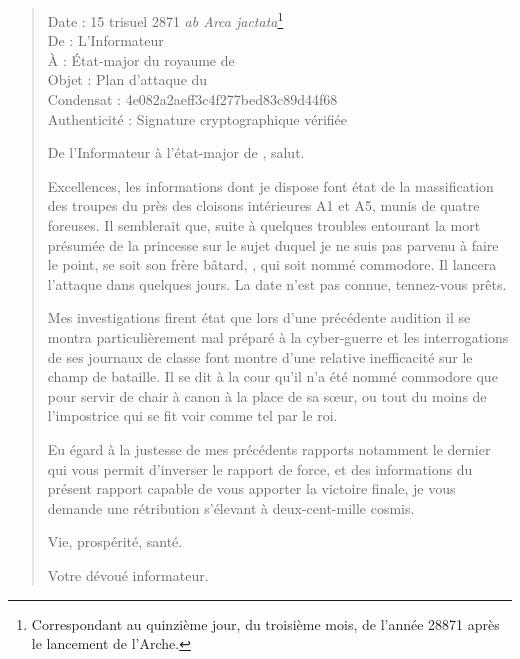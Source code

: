 \begin{quotation}
  \ttfamily\RaggedRight
  \noindent{}Date : 15 trisuel 2871 \emph{ab Arca jactata}\footnote{Correspondant au quinzième jour, du troisième mois, de l’année 28871 après le lancement de l’Arche.}\\
  De : L’Informateur\\
  À : État-major du royaume de \campoppose{}\\
  Objet : Plan d’attaque du \campprincipal{}\\
  Condensat : 4e082a2aeff3c4f277bed83c89d44f68\\
  Authenticité : Signature cryptographique vérifiée
  \nopagebreak\vspace{1em}

  De l’Informateur à l’état-major de \campoppose{}, salut.
  \nopagebreak\vspace{1em}

  Excellences, les informations dont je dispose font état de la massification des troupes du \campprincipal{} près des cloisons intérieures A1 et A5, munis de quatre foreuses. Il semblerait que, suite à quelques troubles entourant la mort présumée de la princesse \princesse sur le sujet duquel je ne suis pas parvenu à faire le point, se soit son frère bâtard, \elena, qui soit nommé commodore. Il lancera l’attaque dans quelques jours. La date n’est pas connue, tennez-vous prêts.

  Mes investigations firent état que lors d’une précédente audition il se montra particulièrement mal préparé à la cyber-guerre et les interrogations de ses journaux de classe font montre d’une relative inefficacité sur le champ de bataille. Il se dit à la cour qu’il n’a été nommé commodore que pour servir de chair à canon à la place de sa sœur, ou tout du moins de l’impostrice qui se fit voir comme tel par le roi.

  Eu égard à la justesse de mes précédents rapports notamment le dernier qui vous permit d’inverser le rapport de force, et des informations du présent rapport capable de vous apporter la victoire finale, je vous demande une rétribution s’élevant à deux-cent-mille cosmis.

  \nopagebreak\vspace{1em}
  Vie, prospérité, santé.

  \nopagebreak\vspace{1em}
  \hfill Votre dévoué informateur.
\end{quotation}


